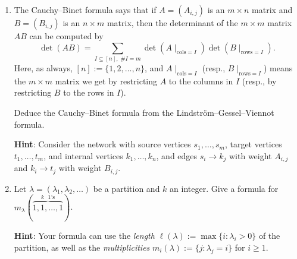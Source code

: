 \documentclass[11pt]{article}
\begin{document}
\begin{enumerate}
\item The Cauchy--Binet formula says that if $A=(A_{i,j})$ is an $m \times n$ matrix and $B=(B_{i,j})$ is an $n\times m$ matrix, then the determinant of the $m \times m$ matrix $AB$ can be computed by
\[ \det(AB) = \sum_{I \subseteq [n], \; \#I = m} \det(A\mid_{\mathrm{cols}=I})  \det(B\mid_{\mathrm{rows}=I}). \]
Here, as always, $[n] := \{1,2,\ldots,n\}$, and $A\mid_{\mathrm{cols}=I}$ (resp., $B\mid_{\mathrm{rows}=I}$) means the $m\times m$ matrix we get by restricting $A$ to the columns in $I$ (resp., by restricting $B$ to the rows in $I$).

Deduce the Cauchy--Binet formula from the Lindstr\"{o}m--Gessel--Viennot formula.

{\bf Hint}: Consider the network with source vertices $s_1,\ldots,s_m$, target vertices $t_1,\ldots,t_m$, and internal vertices $k_1,\ldots, k_n$, and edges $s_i \to k_j$ with weight $A_{i,j}$ and $k_i \to t_j$ with weight $B_{i,j}$.

\item Let $\lambda=(\lambda_1,\lambda_2,\ldots)$ be a partition and $k$ an integer. Give a formula for $m_{\lambda}(\overbrace{1,1,\ldots,1}^{\textrm{$k$ $1$'s}})$.

{\bf Hint}: Your formula can use the \emph{length} $\ell(\lambda) := \max \{ i\colon \lambda_i > 0 \}$ of the partition, as well as the \emph{multiplicities} $m_i(\lambda) := \{j\colon \lambda_j = i\}$ for $i \geq 1$.

\end{enumerate}
\end{document}
